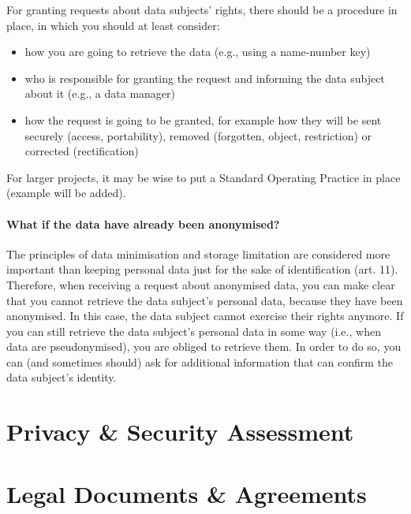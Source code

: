 \documentclass[
]{book}
\providecommand{\tightlist}{%
  \setlength{\itemsep}{0pt}\setlength{\parskip}{0pt}}
\begin{document}
For granting requests about data subjects' rights, there should be a procedure in place, in which you should at least consider:

\begin{itemize}
\tightlist
\item
  how you are going to retrieve the data (e.g., using a name-number key)
\item
  who is responsible for granting the request and informing the data subject about it (e.g., a data manager)
\item
  how the request is going to be granted, for example how they will be sent securely (access, portability), removed (forgotten, object, restriction) or corrected (rectification)
\end{itemize}

For larger projects, it may be wise to put a Standard Operating Practice in place (example will be added).

\hypertarget{what-if-the-data-have-already-been-anonymised}{%
\subsubsection{What if the data have already been anonymised?}\label{what-if-the-data-have-already-been-anonymised}}

The principles of data minimisation and storage limitation are considered more important than keeping personal data just for the sake of identification (art. 11). Therefore, when receiving a request about anonymised data, you can make clear that you cannot retrieve the data subject's personal data, because they have been anonymised. In this case, the data subject cannot exercise their rights anymore.
If you can still retrieve the data subject's personal data in some way (i.e., when data are pseudonymised), you are obliged to retrieve them. In order to do so, you can (and sometimes should) ask for additional information that can confirm the data subject's identity.

\hypertarget{privacy-by-design}{%
\chapter{Privacy \& Security Assessment}\label{privacy-by-design}}

\hypertarget{legal-documents}{%
\chapter{Legal Documents \& Agreements}\label{legal-documents}}
\end{document}
